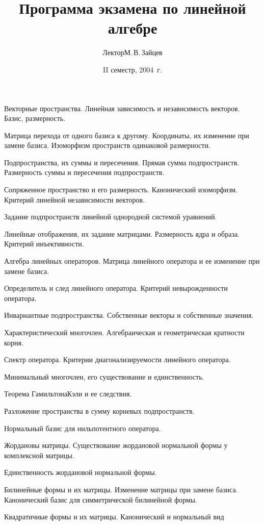 \documentclass[a4paper]{article}
\title{Программа экзамена по линейной алгебре}
\author{Лектор\т М.\,В.\,Зайцев}
\date{II семестр, 2004~г.}
\begin{document}
\maketitle

\begin{nums}{-2}
\item Векторные пространства. Линейная зависимость и независимость векторов.
Базис, размерность.
\item Матрица перехода от одного базиса к другому. Координаты, их изменение при
замене базиса. Изоморфизм пространств одинаковой размерности.
\item Подпространства, их суммы и пересечения. Прямая сумма подпространств.
Размерность суммы и пересечения подпространств.
\item Сопряженное пространство и его размерность. Канонический изоморфизм.
Критерий линейной независимости векторов.
\item Задание подпространств линейной однородной системой уравнений.
\item Линейные отображения, их задание матрицами. Размерность ядра и образа.
Критерий инъективности.
\item Алгебра линейных операторов. Матрица линейного оператора и ее изменение
при замене базиса.
\item Определитель и след линейного оператора. Критерий невырожденности
оператора.
\item Инвариантные подпространства. Собственные векторы и собственные значения.
\item Характеристический многочлен. Алгебраическая и геометрическая кратности
корня.
\item Спектр оператора. Критерии диагонализируемости линейного оператора.
\item Минимальный многочлен, его существование и единственность.
\item Теорема Гамильтона\ч Кэли и ее следствия.
\item Разложение пространства в сумму корневых подпространств.
\item Нормальный базис для нильпотентного оператора.
\item Жордановы матрицы. Существование жордановой нормальной формы у
комплексной матрицы.
\item Единственность жордановой нормальной формы.
\item Билинейные формы и их матрицы. Изменение матрицы при замене базиса.
Канонический базис для симметрической билинейной формы.
\item Квадратичные формы и их матрицы. Канонический и нормальный вид

\end{nums}
\end{document}
